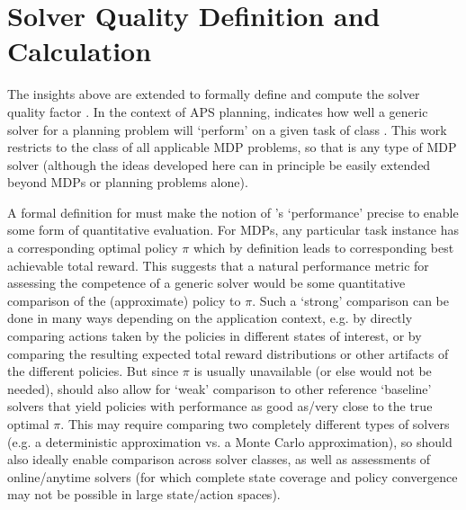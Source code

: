 \section{Solver Quality Definition and Calculation} \label{sec:SQ}


The insights above are extended to formally define and compute the solver quality \famsec{} factor \xQ{}. In the context of APS planning, \xQ{} indicates how well a generic solver \solve{} for a planning problem will `perform' on a given task \task{} of class \taskclass{}. This work restricts \taskclass{} to the class of all applicable MDP problems, so that \solve{} is any type of MDP solver  (although the ideas developed here can in principle be easily extended beyond MDPs or planning problems alone). %


A formal definition for \xQ{} must make the notion of \solve{}'s `performance' precise to enable some form of quantitative evaluation. For MDPs, any particular task instance \task{} has a corresponding optimal policy $\pi$ which by definition leads to corresponding best achievable total reward. This suggests that a natural performance metric for assessing the competence of a generic solver \solve{} would be some quantitative comparison of the (approximate) policy \tilde{\pi} to $\pi$. Such a `strong' comparison can be done in many ways depending on the application context, e.g. by directly comparing actions taken by the policies in different states of interest, or by comparing the resulting expected total reward distributions or other artifacts of the different policies. 
But since $\pi$ is usually unavailable (or else \solve{} would not be needed), \xQ{} should also allow for `weak' comparison to other reference `baseline' solvers that yield policies with performance as good as/very close to the true optimal $\pi$. This may require comparing two completely different types of solvers (e.g. a deterministic approximation vs. a Monte Carlo approximation), so \xQ{} should also ideally enable comparison across solver classes, as well as assessments of online/anytime solvers (for which complete state coverage and policy convergence may not be possible in large state/action spaces). %

